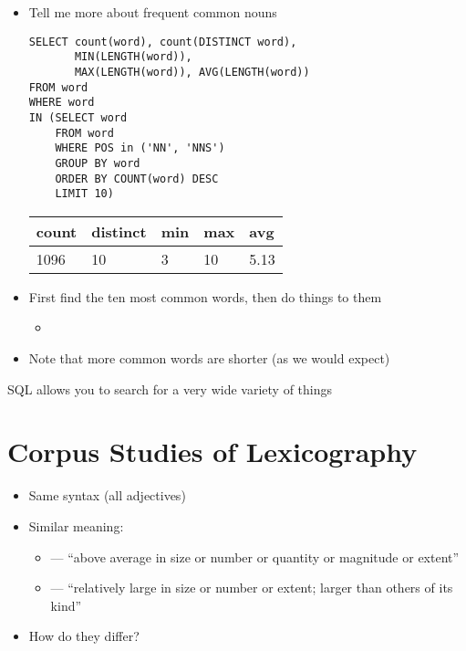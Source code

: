 \documentclass[a4paper,landscape,headrule,footrule,dvips]{foils}
\begin{document}
\begin{CJK}{UTF8}{min}

\begin{itemize}
\item Tell me more about frequent common nouns
\begin{verbatim}
SELECT count(word), count(DISTINCT word),
       MIN(LENGTH(word)), 
       MAX(LENGTH(word)), AVG(LENGTH(word))
FROM word
WHERE word 
IN (SELECT word
    FROM word
    WHERE POS in ('NN', 'NNS') 
    GROUP BY word
    ORDER BY COUNT(word) DESC
    LIMIT 10)

\end{verbatim}
  \begin{tabular}{lllll}
    \textbf{count}  & \textbf{distinct} &\textbf{min}  &  \textbf{max} & \textbf{avg} \\ \hline
    1096 & 10 & 3 & 10 & 5.13
  \end{tabular}
\item First find the ten most common words, then do things to them
  \begin{itemize}
  \item {}
  \end{itemize}
\item Note that more common words are shorter (as we would expect)
\end{itemize}
\begin{center}
  SQL allows you to search for a very wide variety of things
\end{center}


\section{Corpus Studies of Lexicography}


\begin{itemize}
\item Same syntax (all adjectives)
\item Similar meaning:
  \begin{itemize}
  \item {} --- ``above average in size or number or quantity or magnitude or extent'' 
  \item {} --- ``relatively large in size or number or extent; larger than others of its kind''  
\end{itemize}
\item How do they differ?
\end{itemize}


\end{CJK}
\end{document}
